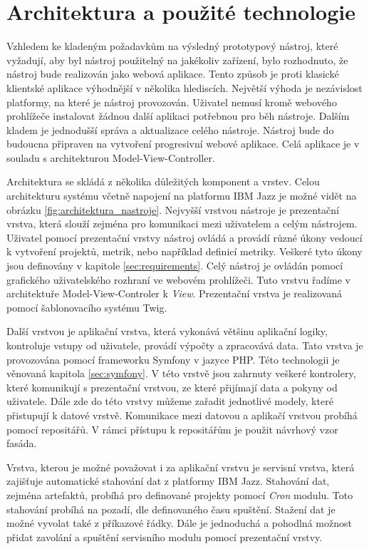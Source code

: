 \documentclass[czech,master]{diploma}
\begin{document}
\section{Architektura a použité technologie}
Vzhledem ke kladeným požadavkům na výsledný prototypový nástroj, které vyžadují, aby byl nástroj použitelný na jakékoliv zařízení, bylo rozhodnuto, že nástroj bude realizován jako webová aplikace. Tento způsob je proti klasické klientské aplikace výhodnější v několika hlediscích. Největší výhoda je nezávislost platformy, na které je nástroj provozován. Uživatel nemusí kromě webového prohlížeče instalovat žádnou další aplikaci potřebnou pro běh nástroje. Dalším kladem je jednodušší správa a aktualizace celého nástroje. Nástroj bude do budoucna připraven na vytvoření progresivní webové aplikace. Celá aplikace je v souladu s architekturou Model-View-Controller.

Architektura se skládá z několika důležitých komponent a vrstev. Celou architekturu systému včetně napojení na platformu IBM Jazz je možné vidět na obrázku \ref{fig:architektura_nastroje}. Nejvyšší vrstvou nástroje je prezentační vrstva, která slouží zejména pro komunikaci mezi uživatelem a celým nástrojem. Uživatel pomocí prezentační vrstvy nástroj ovládá a provádí různé úkony vedoucí k vytvoření projektů, metrik, nebo například definicí metriky. Veškeré tyto úkony jsou definovány v kapitole \ref{sec:requirements}. Celý nástroj je ovládán pomocí grafického uživatelského rozhraní ve webovém prohlížeči. Tuto vrstvu řadíme v architektuře Model-View-Controler k \textit{View}. Prezentační vrstva je realizovaná pomocí šablonovacího systému Twig.

Další vrstvou je aplikační vrstva, která vykonává většinu aplikační logiky, kontroluje vstupy od uživatele, provádí výpočty a zpracovává data. Tato vrstva je provozována pomocí frameworku Symfony v jazyce PHP. Této technologii je věnovaná kapitola \ref{sec:symfony}. V této vrstvě jsou zahrnuty veškeré kontrolery, které komunikují s prezentační vrstvou, ze které přijímají data a pokyny od uživatele. Dále zde do této vrstvy můžeme zařadit jednotlivé modely, které přistupují k datové vrstvě. Komunikace mezi datovou a aplikačí vrstvou probíhá pomocí repositářů. V rámci přístupu k repositářům je použit návrhový vzor fasáda.

Vrstva, kterou je možné považovat i za aplikační vrstvu je servisní vrstva, která zajišťuje automatické stahování dat z platformy IBM Jazz. Stahování dat, zejména artefaktů, probíhá pro definované projekty pomocí \textit{Cron} modulu. Toto stahování probíhá na pozadí, dle definovaného času spuštění. Stažení dat je možné vyvolat také z příkazové řádky. Dále je jednoduchá a pohodlná možnost přidat zavolání a spuštění servisního modulu pomocí prezentační vrstvy.
\end{document}
